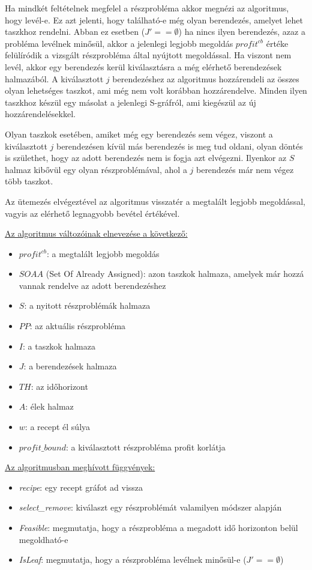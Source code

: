 Ha mindkét feltételnek megfelel a részprobléma akkor megnézi az algoritmus, hogy levél-e. Ez azt jelenti, hogy található-e még olyan berendezés, amelyet lehet taszkhoz rendelni. Abban ez esetben ($J'== \emptyset$) ha nincs ilyen berendezés, azaz a probléma levélnek minősül, akkor a jelenlegi legjobb megoldás $profit^{cb}$ értéke felülíródik a vizsgált részprobléma által nyújtott megoldással. Ha viszont nem levél, akkor egy berendezés kerül kiválasztásra a még elérhető berendezések halmazából. A kiválasztott $j$ berendezéshez az algoritmus hozzárendeli az összes olyan lehetséges taszkot, ami még nem volt korábban hozzárendelve. Minden ilyen taszkhoz készül egy másolat a jelenlegi S-gráfról, ami kiegészül az új hozzárendelésekkel.

Olyan taszkok esetében, amiket még egy berendezés sem végez, viszont a kiválasztott $j$ berendezésen kívül más berendezés is meg tud oldani, olyan döntés is születhet, hogy az adott berendezés nem is fogja azt elvégezni. Ilyenkor az $S$ halmaz kibővül egy olyan részproblémával, ahol a $j$ berendezés már nem végez több taszkot. 

Az ütemezés elvégeztével az algoritmus visszatér a megtalált legjobb megoldással, vagyis az elérhető legnagyobb bevétel értékével.

\newpage
\underline{Az algoritmus változóinak elnevezése a következő:}
\begin{itemize}
	\item $profit^{cb}$: a megtalált legjobb megoldás
	\item $SOAA$ (Set Of Already Assigned): azon taszkok halmaza, amelyek már hozzá vannak rendelve az adott berendezéshez
	\item $S$: a nyitott részproblémák halmaza
	\item $PP$: az aktuális részprobléma
	\item $I$: a taszkok halmaza
	\item $J$: a berendezések halmaza
	\item $TH$: az időhorizont
	\item $A$: élek halmaz
	\item $w$: a recept él súlya
	\item $profit\_bound$: a kiválasztott részprobléma profit korlátja
\end{itemize}

\underline{Az algoritmusban meghívott függvények:}
\begin{itemize}
	\item \textit{recipe}: egy recept gráfot ad vissza
	\item \textit{select\_remove}: kiválaszt egy részproblémát valamilyen módszer alapján
	\item \textit{Feasible}: megmutatja, hogy a részprobléma a megadott idő horizonton belül megoldható-e
	\item \textit{IsLeaf}: megmutatja, hogy a részprobléma levélnek minősül-e ($J'==\emptyset$)
\end{itemize}

